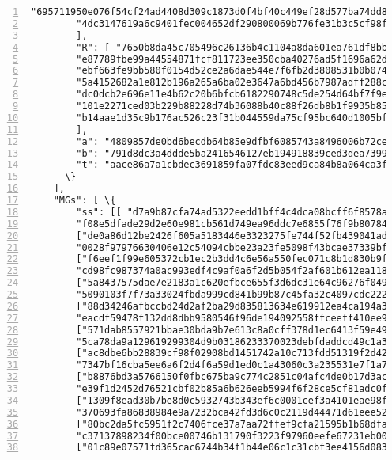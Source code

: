 \begin{Verbatim}[commandchars=\\\{\}, numbers=left]
        "695711950e076f54cf24ad4408d309c1873d0f4bf40c449ef28d577ba74dd86d",
        "4dc3147619a6c9401fec004652df290800069b776fe31b3c5cf98f64eb13ef2c"
        ], 
        "R": [ "7650b8da45c705496c26136b4c1104a8da601ea761df8bba07f1249495d8f1ce",
        "e87789fbe99a44554871fcf811723ee350cba40276ad5f1696a62d91a4363fa6",
        "ebf663fe9bb580f0154d52ce2a6dae544e7f6fb2d3808531b0b0749f5152ddbf",
        "5a4152682a1e812b196a265a6ba02e3647a6bd456b7987adff288c5b0b556ec6",
        "dc0dcb2e696e11e4b62c20b6bfcb6182290748c5de254d64bf7f9e3c38fb46c9",
        "101e2271ced03b229b88228d74b36088b40c88f26db8b1f9935b85fb3ab96043",
        "b14aae1d35c9b176ac526c23f31b044559da75cf95bc640d1005bfcc6367040b"
        ], 
        "a": "4809857de0bd6becdb64b85e9dfbf6085743a8496006b72ceb81e01080965003", 
        "b": "791d8dc3a4ddde5ba2416546127eb194918839ced3dea7399f9c36a17f36150e", 
        "t": "aace86a7a1cbdec3691859fa07fdc83eed9ca84b8a064ca3f0149e7d6b721c03"
      \}
    ], 
    "MGs": [ \{
        "ss": [[ "d7a9b87cfa74ad5322eedd1bff4c4dca08bcff6f8578a29a8bc4ad6789dee106",
        "f08e5dfade29d2e60e981cb561d749ea96ddc7e6855f76f9b807842d1a17fe00"],
        ["de0a86d12be2426f605a5183446e3323275fe744f52fb439041ad2d59136ea0b",
        "0028f97976630406e12c54094cbbe23a23fe5098f43bcae37339bfc0c4c74c07"],
        ["f6eef1f99e605372cb1ec2b3dd4c6e56a550fec071c8b1d830b9fda34de5cc05",
        "cd98fc987374a0ac993edf4c9af0a6f2d5b054f2af601b612ea118f405303306"],
        ["5a8437575dae7e2183a1c620efbce655f3d6dc31e64c96276f04976243461e08",
        "5090103f7f73a33024fbda999cd841b99b87c45fa32c4097cdc222fa3d7e9502"],
        ["88d34246afbccbd24d2af2ba29d835813634e619912ea4ca194a32281ac14e0e",
        "eacdf59478f132dd8dbb9580546f96de194092558ffceeff410ee9eb30ce570e"],
        ["571dab8557921bbae30bda9b7e613c8a0cff378d1ec6413f59e4972f30f2470d",
        "5ca78da9a129619299304d9b03186233370023debfdaddcd49c1a338c1f0c50d"],
        ["ac8dbe6bb28839cf98f02908bd1451742a10c713fdd51319f2d42a58bf1d7507",
        "7347bf16cba5ee6a6f2d4f6a59d1ed0c1a43060c3a235531e7f1a75cd8c8530d"],
        ["b8876bd3a5766150f0fbc675ba9c774c2851c04afc4de0b17d3ac4b6de617402",
        "e39f1d2452d76521cbf02b85a6b626eeb5994f6f28ce5cf81adc0ff2b8adb907"],
        ["1309f8ead30b7be8d0c5932743b343ef6c0001cef3a4101eae98ffde53f46300",
        "370693fa86838984e9a7232bca42fd3d6c0c2119d44471d61eee5233ba53c20f"],
        ["80bc2da5fc5951f2c7406fce37a7aa72ffef9cfa21595b1b68dfab4b7b9f9f0c",
        "c37137898234f00bce00746b131790f3223f97960eefe67231eb001092f5510c"],
        ["01c89e07571fd365cac6744b34f1b44e06c1c31cbf3ee4156d08309345fdb20e",

\end{Verbatim}

